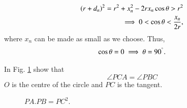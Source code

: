%
\begin{align}
\left(r+d_n\right)^2 = r^2 + x_n^2 - 2rx_n\cos\theta > r^2 
\\
\implies  0 <\cos\theta < \frac{x_n}{2r},
\end{align}
%
where $x_n$ can be made as small as we choose.  Thus, 
%
\begin{align}
\cos \theta = 0 \implies \theta  = 90 ^{\degree}.
\end{align}

%
\begin{problem}
In Fig. \ref{ch4_tangent_prod} show that 
%
\begin{equation}
\angle PCA = \angle PBC
\end{equation}
%
$O$ is the centre of the circle and $PC$ is the tangent.
\end{problem}
	\begin{figure}[!ht]
		\begin{center}
			
			\resizebox{\columnwidth}{!}{}
		\end{center}
		\caption{$PA.PB = PC^2$.}
		\label{ch4_tangent_prod}	
	\end{figure}

